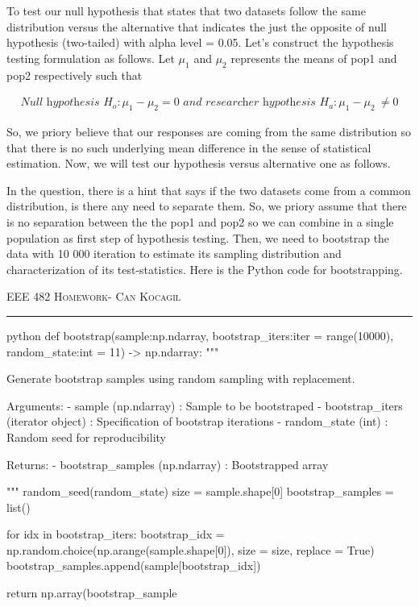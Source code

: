 \documentclass[12pt]{amsart}
\begin{document}
\bigskip

To test our null hypothesis that states that two datasets follow the same distribution versus the alternative that indicates the just the opposite of null hypothesis (two-tailed) with alpha level = 0.05. Let's construct the hypothesis testing formulation as follows. Let $\mu_1$ and $\mu_2$ represents the means of pop1 and pop2 respectively such that

\begin{align*}
    \textit{Null hypothesis } H_o : \mu_1 - \mu_2 = 0 
    \textit{ and researcher hypothesis } H_a : \mu_1 - \mu_2 \	\neq 0
\end{align*}

So, we priory believe that our responses are coming from the same distribution so that there is no such underlying mean difference in the sense of statistical estimation. Now, we will test our hypothesis versus alternative one as follows.

\bigskip
In the question, there is a hint that says if the two datasets come from a common distribution, is there any need to separate
them. So, we priory assume that there is no separation between the the pop1 and pop2 so we can combine in a single population as first step of hypothesis testing. Then, we need to bootstrap the data with 10 000 iteration to estimate its sampling distribution and characterization of its test-statistics. Here is the Python code for bootstrapping.


\newpage
{\scshape EEE 482} \hfill {\scshape \large  Homework-\relax} \hfill {\scshape Can Kocagil}
\smallskip
\hrule
\vspace{2mm}


\begin{mintedbox}{python}
def bootstrap(sample:np.ndarray, bootstrap_iters:iter = range(10000), random_state:int = 11) -> np.ndarray:
    """
    
        Generate bootstrap samples using random sampling with replacement.
        
            Arguments:
                - sample (np.ndarray) : Sample to be bootstraped
                - bootstrap_iters (iterator object) : Specification of bootstrap iterations
                - random_state (int) : Random seed for reproducibility

            Returns:
                - bootstrap_samples (np.ndarray) : Bootstrapped array

    """
    random_seed(random_state)
    size = sample.shape[0]
    bootstrap_samples = list()

    for idx in bootstrap_iters:        
        bootstrap_idx = np.random.choice(np.arange(sample.shape[0]), size = size, replace = True)
        bootstrap_samples.append(sample[bootstrap_idx])
    
    return np.array(bootstrap_sample
\end{mintedbox}
\end{document}
